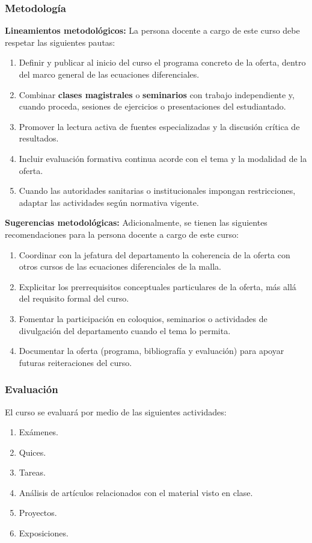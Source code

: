 \begin{refsection}
\subsubsection*{Metodología}

\noindent \textbf{Lineamientos metodológicos:} La persona docente a cargo de este curso debe respetar las siguientes pautas:

\begin{enumerate}
    \item Definir y publicar al inicio del curso el programa concreto de la oferta, dentro del marco general de las ecuaciones diferenciales.
    \item Combinar \textbf{clases magistrales} o \textbf{seminarios} con trabajo independiente y, cuando proceda, sesiones de ejercicios o presentaciones del estudiantado.
    \item Promover la lectura activa de fuentes especializadas y la discusión crítica de resultados.
    \item Incluir evaluación formativa continua acorde con el tema y la modalidad de la oferta.
    \item Cuando las autoridades sanitarias o institucionales impongan restricciones, adaptar las actividades según normativa vigente.
\end{enumerate}

\textbf{Sugerencias metodológicas:} Adicionalmente, se tienen las siguientes recomendaciones para la persona docente a cargo de este curso:

\begin{enumerate}
    \item Coordinar con la jefatura del departamento la coherencia de la oferta con otros cursos de las ecuaciones diferenciales de la malla.
    \item Explicitar los prerrequisitos conceptuales particulares de la oferta, más allá del requisito formal del curso.
    \item Fomentar la participación en coloquios, seminarios o actividades de divulgación del departamento cuando el tema lo permita.
    \item Documentar la oferta (programa, bibliografía y evaluación) para apoyar futuras reiteraciones del curso.
\end{enumerate}

\subsubsection*{Evaluación}

El curso se evaluará por medio de las siguientes actividades:

\begin{enumerate}
\item Exámenes.
\item Quices.
\item Tareas.
\item Análisis de artículos relacionados con el material visto en clase.
\item Proyectos.
\item Exposiciones.
\end{enumerate}

\end{refsection}
